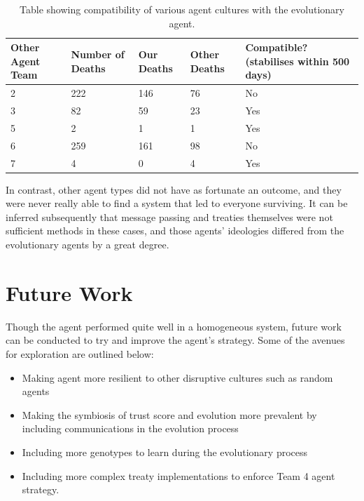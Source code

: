 \begin{table}[htb]
    \centering
    \begin{tabular}{|p{5em}|p{5em}|p{5em}|p{5em}|p{9em}|}
    \hline
        Other Agent Team & Number of Deaths & Our Deaths & Other Deaths & Compatible? (stabilises within 500 days) \\
         \hline
         \hline
        2 & 222 & 146 & 76 & No \\
         \hline
        3 & 82 & 59 & 23 & Yes \\
         \hline
        5 & 2 & 1 & 1 & Yes \\
         \hline
        6 & 259 & 161 & 98 & No \\
         \hline
        7 & 4 & 0 & 4 & Yes \\
         \hline
    \end{tabular}
    \caption{Table showing compatibility of various agent cultures with the evolutionary agent.}
    \label{tab:agentCompatibility}
\end{table}

In contrast, other agent types did not have as fortunate an outcome, and they were never really able to find a system that led to everyone surviving. It can be inferred subsequently that message passing and treaties themselves were not sufficient methods in these cases, and those agents' ideologies differed from the evolutionary agents by a great degree.

\section{Future Work}
Though the agent performed quite well in a homogeneous system, future work can be conducted to try and improve the agent's strategy. Some of the avenues for exploration are outlined below:

\begin{itemize}
    \item Making agent more resilient to other disruptive cultures such as random agents 
    \item Making the symbiosis of trust score and evolution more prevalent by including communications in the evolution process
    \item Including more genotypes to learn during the evolutionary process
    \item Including more complex treaty implementations to enforce Team 4 agent strategy.
\end{itemize}
